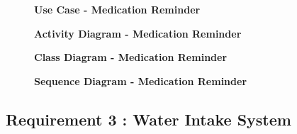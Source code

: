 \documentclass{article}
\begin{document}
\clearpage

\begin{figure}[htbp]
	\textbf{Use Case - Medication Reminder}
	\centering
	\begin{subfigure}{\textwidth}
		\resizebox{\textwidth}{!}{}
	\end{subfigure}
	\begin{subfigure}{\textwidth}
	\end{subfigure}
\end{figure}

\clearpage


\begin{figure}[htbp]
	\textbf{Activity Diagram - Medication Reminder }
	\centering
	\begin{subfigure}{\textwidth}
		\resizebox{\textwidth}{!}{}
	\end{subfigure}
	\begin{subfigure}{\textwidth}
	\end{subfigure}
\end{figure}

\clearpage

\begin{figure}[htbp]
	\textbf{Class Diagram - Medication Reminder}
	\centering
	\begin{subfigure}{\textwidth}
		\resizebox{\textwidth}{!}{}
	\end{subfigure}
	\begin{subfigure}{\textwidth}
	\end{subfigure}
\end{figure}

\clearpage

\begin{figure}[htbp]
	\textbf{Sequence Diagram - Medication Reminder}
	\centering
	\begin{subfigure}{\textwidth}
		\resizebox{\textwidth}{!}{}
	\end{subfigure}
	\begin{subfigure}{\textwidth}
	\end{subfigure}
\end{figure}

\clearpage


\subsection{Requirement 3 : Water Intake System}
\end{document}
